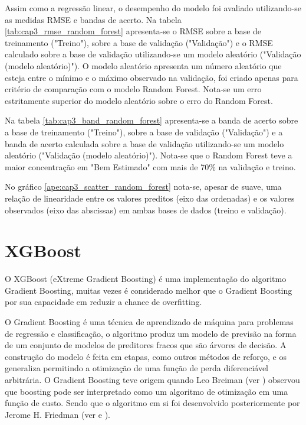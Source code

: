 Assim como a regressão linear, o desempenho do modelo foi avaliado utilizando-se as medidas RMSE e bandas de acerto. Na tabela \ref{tab:cap3_rmse_random_forest} apresenta-se o RMSE sobre a base de treinamento ("Treino"), sobre a base de validação ("Validação") e o RMSE calculado sobre a base de validação utilizando-se um modelo aleatório ("Validação (modelo aleatório)"). O modelo aleatório apresenta um número aleatório que esteja entre o mínimo e o máximo observado na validação, foi criado apenas para critério de comparação com o modelo Random Forest. Nota-se um erro estritamente superior do modelo aleatório sobre o erro do Random Forest.

Na tabela \ref{tab:cap3_band_random_forest} apresenta-se a banda de acerto sobre a base de treinamento ("Treino"), sobre a base de validação ("Validação") e a banda de acerto calculada sobre a base de validação utilizando-se um modelo aleatório ("Validação (modelo aleatório)"). Nota-se que o Random Forest teve a maior concentração em "Bem Estimado" com mais de 70\% na validação e treino.

No gráfico \ref{ape:cap3_scatter_random_forest} nota-se, apesar de suave, uma relação de linearidade entre os valores preditos (eixo das ordenadas) e os valores observados (eixo das abscissas) em ambas bases de dados (treino e validação).

\section{XGBoost}
\label{sec:xgboost}

O XGBoost (eXtreme Gradient Boosting) é uma implementação do algoritmo Gradient Boosting, muitas vezes é considerado melhor que o Gradient Boosting por sua capacidade em reduzir a chance de overfitting.

O Gradient Boosting é uma técnica de aprendizado de máquina para problemas de regressão e classificação, o algoritmo produz um modelo de previsão na forma de um conjunto de modelos de preditores fracos que são árvores de decisão. A construção do modelo é feita em etapas, como outros métodos de reforço, e os generaliza permitindo a otimização de uma função de perda diferenciável arbitrária. O Gradient Boosting teve origem quando Leo Breiman (ver \citet{Breiman1997}) observou que boosting pode ser interpretado como um algoritmo de otimização em uma função de custo. Sendo que o algoritmo em si foi desenvolvido posteriormente por Jerome H. Friedman (ver \citet{Friedman199902} e \citet{Friedman199903}).

